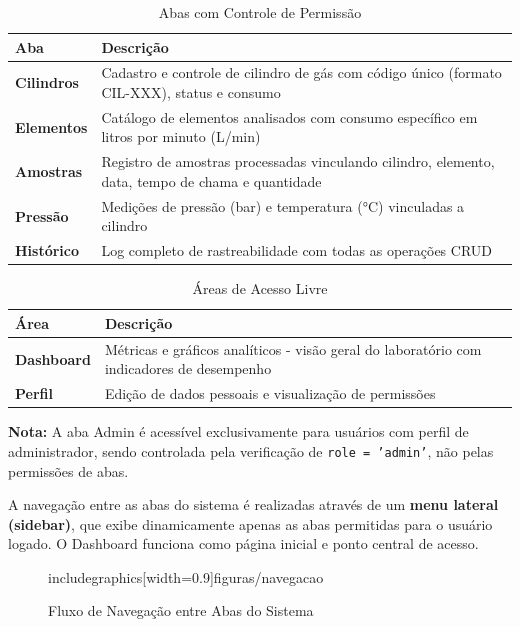 \documentclass[12pt,a4paper]{article}
\providecommand\关键字[1]{\textbf{#1}}
\begin{document}

\begin{table}[h!]
\centering
\caption{Abas com Controle de Permissão}
\label{tab:abas-controladas}
\begin{tabular}{@{}ll@{}}
\toprule
\textbf{Aba} & \textbf{Descrição} \\
\midrule
\textbf{Cilindros} & Cadastro e controle de cilindro de gás com código único (formato CIL-XXX), status e consumo \\
\textbf{Elementos} & Catálogo de elementos analisados com consumo específico em litros por minuto (L/min) \\
\textbf{Amostras} & Registro de amostras processadas vinculando cilindro, elemento, data, tempo de chama e quantidade \\
\textbf{Pressão} & Medições de pressão (bar) e temperatura (°C) vinculadas a cilindro \\
\textbf{Histórico} & Log completo de rastreabilidade com todas as operações CRUD \\
\bottomrule
\end{tabular}
\end{table}


\begin{table}[h!]
\centering
\caption{Áreas de Acesso Livre}
\label{tab:abas-livres}
\begin{tabular}{@{}ll@{}}
\toprule
\textbf{Área} & \textbf{Descrição} \\
\midrule
\textbf{Dashboard} & Métricas e gráficos analíticos - visão geral do laboratório com indicadores de desempenho \\
\textbf{Perfil} & Edição de dados pessoais e visualização de permissões \\
\bottomrule
\end{tabular}
\end{table}

\textbf{Nota:} A aba Admin é acessível exclusivamente para usuários com perfil de administrador, sendo controlada pela verificação de \texttt{role = 'admin'}, não pelas permissões de abas.

A navegação entre as abas do sistema é realizadas através de um \textbf{menu lateral (sidebar)}, que exibe dinamicamente apenas as abas permitidas para o usuário logado. O Dashboard funciona como página inicial e ponto central de acesso.

\begin{figure}[h!]
\centering
includegraphics[width=0.9\textwidth]{figuras/navegacao}
\caption{Fluxo de Navegação entre Abas do Sistema}
\label{fig:navegacao}
\end{figure}
\end{document}

